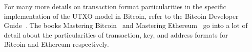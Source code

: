 For many more details on transaction format particularities in the specific implementation of the UTXO
model in Bitcoin, refer to the Bitcoin Developer Guide~\cite{bitcoin-dev-guide}.
The books Mastering Bitcoin~\cite{mastering-bitcoin} and Mastering Ethereum~\cite{mastering-ethereum}
go into a lot of detail about the particularities of transaction, key, and address formats
for Bitcoin and Ethereum respectively.

%
